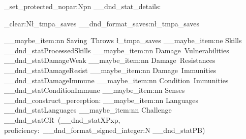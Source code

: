 \cs_set_protected_nopar:Npn \LEGACY__dnd_stat_details:
{
	\tl_clear:N\l_tmpa_saves
	\LEGACY__dnd_format_saves:n{\l_tmpa_saves}
	\begin {description}[
		before   = \color {StatblockHeading},
		font     = \RpgFontStatBlockBody\color {StatblockHeading},
		labelsep = \__rpg_SpaceDim,
		nosep]

	\__maybe_item:nn {Saving~Throws}			{\l_tmpa_saves}
	\__maybe_item:ne {Skills}					{\__dnd_statProcessedSkills}
	\__maybe_item:nn {Damage~Vulnerabilities}	{\__dnd_statDamageWeak}
	\__maybe_item:nn {Damage~Resistances}		{\__dnd_statDamageResist}
	\__maybe_item:nn {Damage~Immunities}		{\__dnd_statDamageImmune}
	\__maybe_item:nn {Condition~Immunities}		{\__dnd_statConditionImmune}
	\__maybe_item:nn {Senses}					{\__dnd_construct_perception:}
	\__maybe_item:nn {Languages}				{\__dnd_statLanguages}
	\__maybe_item:nn {Challenge}				{\__dnd_statCR{}~(\__dnd_statXP{}xp,~ proficiency:~\__dnd_format_signed_integer:N {\__dnd_statPB})}
	\end {description}
}

